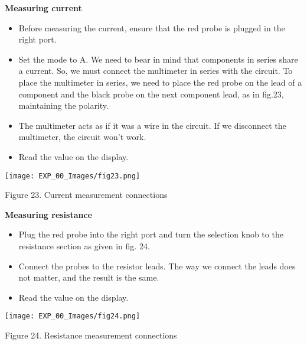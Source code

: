 \documentclass[12pt,a4paper]{article}
\begin{document}
\begin{justify}
\noindent \textbf{Measuring current}
\vspace{-4mm}
\begin{itemize}
\setlength\itemsep{-0.3em}
\item Before measuring the current, ensure that the red probe is plugged in the right port.
\item Set the mode to A. We need to bear in mind that components in series share a current. So, we must connect the multimeter in series with the circuit. To place the multimeter in series, we need to place the red probe on the lead of a component and the black probe on the next component lead, as in fig.23, maintaining the polarity. 
\item The multimeter acts as if it was a wire in the circuit. If we disconnect the multimeter, the circuit won't work.
\item Read the value on the display.
\end{itemize}

\begin{center} 
\texttt{[image: EXP\_00\_Images/fig23.png]}
\end{center}
\vspace{-8mm}
\begin{center} {Figure 23. Current measurement connections}\end{center}


\noindent \textbf{Measuring resistance}
\vspace{-4mm}
\begin{itemize}
 \setlength\itemsep{-0.3em}
\item Plug the red probe into the right port and turn the selection knob to the resistance section as given in fig. 24.
\item Connect the probes to the resistor leads. The way we connect the leads does not matter, and the result is the same.
\item Read the value on the display.
\end{itemize}

\begin{center} 
\texttt{[image: EXP\_00\_Images/fig24.png]}
\end{center}
\vspace{-8mm}
\begin{center} {Figure 24. Resistance measurement connections}\end{center}


\end{justify}
\end{document}
